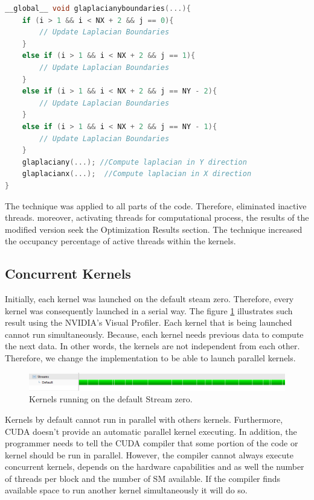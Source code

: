 \begin{lstlisting}[language=C++, label={lst:newcde}, caption={More workload on a single kernel execution}]
__global__ void glaplacianyboundaries(...){
    if (i > 1 && i < NX + 2 && j == 0){
     	// Update Laplacian Boundaries
    }
    else if (i > 1 && i < NX + 2 && j == 1){
  		// Update Laplacian Boundaries
    }
    else if (i > 1 && i < NX + 2 && j == NY - 2){
        // Update Laplacian Boundaries
    }
    else if (i > 1 && i < NX + 2 && j == NY - 1){
        // Update Laplacian Boundaries
    }
    glaplaciany(...); //Compute laplacian in Y direction
	glaplacianx(...);  //Compute laplacian in X direction
}
\end{lstlisting}

The technique was applied to all parts of the code. Therefore, eliminated inactive threads. moreover, activating threads for computational process, the results of the modified version seek the Optimization Results section. The technique increased the occupancy percentage of active threads within the kernels.

\subsection{Concurrent Kernels}

Initially, each kernel was launched on the default steam zero. Therefore, every kernel was consequently launched in a serial way. The figure \ref{fig:streams} illustrates such result using the NVIDIA's Visual Profiler. Each kernel that is being launched cannot run simultaneously. Because, each kernel needs previous data to compute the next data. In other words, the kernels are not independent from each other. Therefore, we change the implementation to be able to launch parallel kernels.

\begin{figure}[htbp]
	\centering
		\includegraphics[width=1.0\textwidth]{Figures/ini_steams.png}
		\smallskip
	\caption[Initial Streams]{Kernels running on the default Stream zero.
}
	\label{fig:streams}
\end{figure}

 Kernels by default cannot run in parallel with others kernels. Furthermore, CUDA doesn't provide an automatic parallel kernel executing. In addition, the programmer needs to tell the CUDA compiler that some portion of the code or kernel should be run in parallel. However, the compiler cannot always execute concurrent kernels, depends on the hardware capabilities and as well the number of threads per block and the number of SM available. If the compiler finds available space to run another kernel simultaneously it will do so. 

